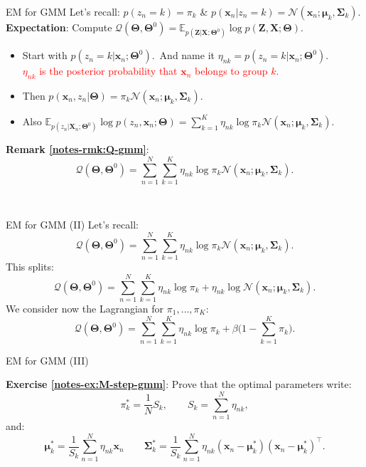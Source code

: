\documentclass{beamer}
\newcommand{\bs}[1]{\boldsymbol{#1}}
\newcommand{\exercise}[2]{\noindent\colorbox{blue!10}{\parbox{0.995\textwidth}{\textbf{Exercise \ref{notes-ex:#1}}: #2}}\\}
\newcommand{\remark}[2]{\noindent\colorbox{red!10}{\parbox{0.995\textwidth}{\textbf{Remark \ref{notes-rmk:#1}}: #2}}\\}
\begin{document}
\begin{frame}{EM for GMM}
 Let's recall: $p(z_n=k)=\pi_k$ \& $p(\bs{x}_n|z_n=k) = \mathcal{N}(\bs{x}_n;\bs{\mu}_k,\bs{\Sigma}_k)$.\vspace{5mm}\\
 \textbf{Expectation}: Compute $\mathcal{Q}(\bs{\Theta},\bs{\Theta}^0) = \mathbb{E}_{p(\bs{Z}|\bs{X};\bs{\Theta}^0)} \log p(\bs{Z},\bs{X};\bs{\Theta})$.\vspace{2mm}\\
 \begin{itemize}
  \item Start with $p(z_n=k|\bs{x}_n;\bs{\Theta}^0)$.\pause\ And name it $\eta_{nk}=p(z_n=k|\bs{x}_n;\bs{\Theta}^0)$.\\
  \textcolor{red}{$\eta_{nk}$ is the posterior probability that $\bs{x}_n$ belongs to group $k$.}\vspace{2mm}
  \item Then $p(\bs{x}_n,z_n|\bs{\Theta})$\pause$ =\pi_k\mathcal{N}(\bs{x}_n;\bs{\mu}_k,\bs{\Sigma}_k)$.\vspace{2mm}
  \item Also $\mathbb{E}_{p(z_n|\bs{X}_n;\bs{\Theta}^0)} \log p(z_n,\bs{x}_n;\bs{\Theta})$\pause$ =\sum_{k=1}^K \eta_{nk} \log \pi_k\mathcal{N}(\bs{x}_n;\bs{\mu}_k,\bs{\Sigma}_k)$.\vspace{2mm}
 \end{itemize}
\remark{Q-gmm}{  \[\mathcal{Q}(\bs{\Theta},\bs{\Theta}^0) = \sum_{n=1}^N\sum_{k=1}^K \eta_{nk} \log \pi_k\mathcal{N}(\bs{x}_n;\bs{\mu}_k,\bs{\Sigma}_k).\]}

\end{frame}
 
 \begin{frame}{EM for GMM (II)}
  Let's recall:
  \[\mathcal{Q}(\bs{\Theta},\bs{\Theta}^0) = \sum_{n=1}^N\sum_{k=1}^K \eta_{nk} \log \pi_k\mathcal{N}(\bs{x}_n;\bs{\mu}_k,\bs{\Sigma}_k).\]
  This splits:
  \[\mathcal{Q}(\bs{\Theta},\bs{\Theta}^0) = \sum_{n=1}^N\sum_{k=1}^K \eta_{nk} \log \pi_k + \eta_{nk}\log\mathcal{N}(\bs{x}_n;\bs{\mu}_k,\bs{\Sigma}_k).\]
  We consider now the Lagrangian for $\pi_1,\ldots,\pi_K$:
  \[\mathcal{Q}(\bs{\Theta},\bs{\Theta}^0) = \sum_{n=1}^N\sum_{k=1}^K \eta_{nk} \log \pi_k + \beta\Big(1-\sum_{k=1}^K \pi_k\Big).\]
 \end{frame}
 
 \begin{frame}{EM for GMM (III)}
  \exercise{M-step-gmm}{Prove that the optimal parameters write:
  \[\pi_k^* = \frac{1}{N}S_k, \qquad S_k = \sum_{n=1}^N \eta_{nk},\]
  and:
  \[\bs{\mu}_k^*=\frac{1}{S_k}\sum_{n=1}^N\eta_{nk}\bs{x}_n\qquad \bs{\Sigma}_k^* = \frac{1}{S_k}\sum_{n=1}^N\eta_{nk} (\bs{x}_n-\bs{\mu}_k^*)(\bs{x}_n-\bs{\mu}_k^*)^\top.\]}
 \end{frame}
\end{document}
